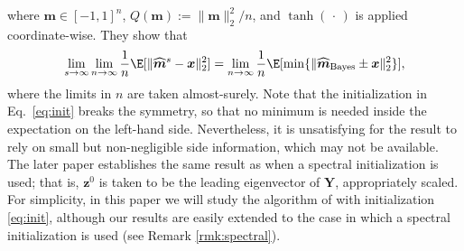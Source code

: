 \documentclass[]{article}
\def\bx{{\boldsymbol x}}
\def\bz{{\boldsymbol z}}
\def\bx{{\boldsymbol x}}
\def\bz{{\boldsymbol z}}
\def\bY{{\boldsymbol Y}}
\def\bbm{{\boldsymbol m}}
\def\bmhat{\widehat{\boldsymbol{m}}{}}
\begin{document}
where $\bbm \in [-1,1]^n$, $Q(\bbm) := \| \bbm \|_2^2 / n$,
and $\tanh(\,\cdot\,)$ is applied coordinate-wise.
They show that 
\begin{equation}
    \lim_{s \rightarrow \infty} \lim_{n \rightarrow \infty} 
        \frac1n\E[\| \bmhat^s - \bx \|_2^2]
        =
        \lim_{n \rightarrow \infty} 
        \frac1n\E[\min\{\| \bmhat_{\mathrm{Bayes}} \pm \bx \|_2^2\}],
\end{equation}
where the limits in $n$ are taken almost-surely.
Note that the initialization in Eq.~\eqref{eq:init} breaks the symmetry, so that no minimum is needed inside the expectation on the left-hand side.
Nevertheless, it is unsatisfying for the result to rely on small but non-negligible side information,
which may not be available.
The later paper \cite{montanari2021} establishes the same result as \cite{deshpande2016} when a spectral initialization is used;
that is, $\bz^0$ is taken to be the leading eigenvector of $\bY$, appropriately scaled.
For simplicity,
in this paper we will study the algorithm of \cite{deshpande2016} with initialization \eqref{eq:init},
although our results are easily extended to the case in which a spectral initialization is used (see Remark \ref{rmk:spectral}).
\end{document}
